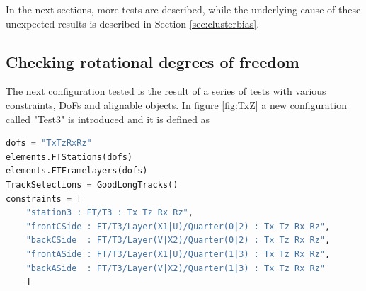 In the next sections, more tests are described, while the underlying cause of these unexpected results is described in Section \ref{sec:clusterbias}.

\subsection{Checking rotational degrees of freedom}
\label{sec:test_and_c5}
The next configuration tested is the result of a series of tests with various constraints, DoFs and alignable objects. In figure \ref{fig:TxZ} a new configuration called "Test3" is introduced and it is defined as

\begin{lstlisting}[language=Python]
dofs = "TxTzRxRz"
elements.FTStations(dofs)
elements.FTFramelayers(dofs)
TrackSelections = GoodLongTracks()
constraints = [
    "station3 : FT/T3 : Tx Tz Rx Rz",
    "frontCSide : FT/T3/Layer(X1|U)/Quarter(0|2) : Tx Tz Rx Rz",
    "backCSide  : FT/T3/Layer(V|X2)/Quarter(0|2) : Tx Tz Rx Rz",
    "frontASide : FT/T3/Layer(X1|U)/Quarter(1|3) : Tx Tz Rx Rz",
    "backASide  : FT/T3/Layer(V|X2)/Quarter(1|3) : Tx Tz Rx Rz"
    ]
\end{lstlisting}

